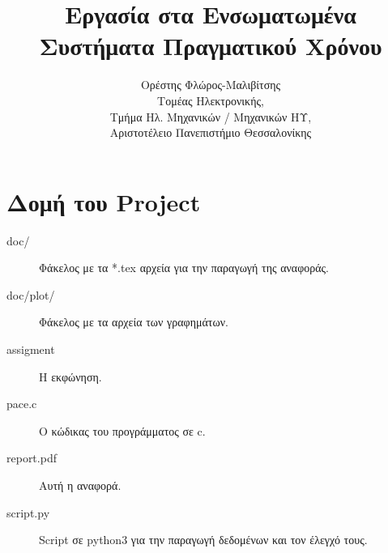 
\usepackage{fontspec}
\setmainfont{DejaVu Serif}
\renewcommand{\contentsname}{Περιεχόμενα}
\renewcommand{\listfigurename}{Λίστα Σχημάτων}
\renewcommand{\figurename}{Σχήμα}
\renewcommand{\lstlistingname}{Καταχώρηση}
\renewcommand{\lstlistlistingname}{List of \lstlistingname s}

\title{Εργασία στα Ενσωματωμένα Συστήματα Πραγματικού Χρόνου}
\author{Ορέστης Φλώρος-Μαλιβίτσης\\
  Τομέας Ηλεκτρονικής,\\
  Τμήμα Ηλ. Μηχανικών / Μηχανικών ΗΥ,\\
  Αριστοτέλειο Πανεπιστήμιο Θεσσαλονίκης}


\maketitle
\tableofcontents
\newpage

\chapter*{Δομή του Project} \label{project-structure}

\begin{description}
	\item[doc/] Φάκελος με τα *.tex αρχεία για την παραγωγή της αναφοράς.
	\item[doc/plot/] Φάκελος με τα αρχεία των γραφημάτων.
	\item[assigment] Η εκφώνηση.
	\item[pace.c] Ο κώδικας του προγράμματος σε c.
	\item[report.pdf] Αυτή η αναφορά.
	\item[script.py] Script σε python3 για την παραγωγή δεδομένων και τον έλεγχό τους.
\end{description}







